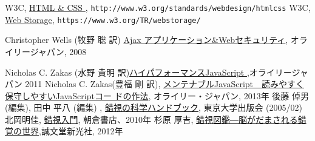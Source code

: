 \begin{thebibliography}{99}
 W3C,
				 \href{http://www.w3.org/standards/webdesign/htmlcss}
				 {HTML \& CSS
         }, \texttt{http://www.w3.org/standards/webdesign/htmlcss}
\ifSeminor
\else
 W3C, \href{https://www.w3.org/TR/webstorage/}
				 {Web Storage}, \texttt{https://www.w3.org/TR/webstorage/}
\fi
\iffalse\else
\ifSeminor
\else
 Christopher Wells (牧野 聡  訳)
\href{http://www.amazon.co.jp/Ajaxアプリケーション-Webセキュリティ-Christopher-Wells/dp/487311358X/ref=sr_1_2?ie=UTF8&s=books&qid=1208068747&sr=8-2}
	 {Ajax アプリケーション\&Webセキュリティ}, オライリージャパン, 2008
    \fi
 \fi
 Nicholas C. Zakas (水野 貴明 訳)\href{http://www.amazon.co.jp/%E3%83%8F%E3%82%A4%E3%83%91%E3%83%95%E3%82%A9%E3%83%BC%E3%83%9E%E3%83%B3%E3%82%B9JavaScript-Nicholas-C-Zakas/dp/487311490X/ref=sr_1_1?ie=UTF8&s=books&qid=1304649839&sr=8-1}{ハイパフォーマンスJavaScript },オライリージャパン 2011
Nicholas C. Zakas(豊福 剛 訳), 
\href{http://www.amazon.co.jp/%E3%83%A1%E3%83%B3%E3%83%86%E3%83%8A%E3%83%96%E3%83%ABJavaScript-%E2%80%95%E8%AA%AD%E3%81%BF%E3%82%84%E3%81%99%E3%81%8F%E4%BF%9D%E5%AE%88%E3%81%97%E3%82%84%E3%81%99%E3%81%84JavaScript%E3%82%B3%E3%83%BC%E3%83%89%E3%81%AE%E3%81%9F%E3%82%81%E3%81%AE%E4%BD%9C%E6%B3%95-Nicholas-C-Zakas/dp/4873116104/ref=sr_1_1?ie=UTF8&qid=1365330242&sr=8-1&keywords=%E3%83%A1%E3%83%B3%E3%83%86%E3%83%8A%E3%83%96%E3%83%ABJavaScript%E3%80%80}
{メンテナブルJavaScript　読みやすく保守しやすいJavaScriptコー
ドの作法}, オライリー・ジャパン, 2013年
後藤 倬男 (編集), 田中 平八 (編集) , \href{http://www.amazon.co.jp/%E9%8C%AF%E8%A6%96%E3%81%AE%E7%A7%91%E5%AD%A6%E3%83%8F%E3%83%B3%E3%83%89%E3%83%96%E3%83%83%E3%82%AF-%E5%BE%8C%E8%97%A4-%E5%80%AC%E7%94%B7/dp/4130111159/sr=1-3/qid=1167376185/ref=sr_1_3/503-0729601-8062303?ie=UTF8&s=books}
{錯視の科学ハンドブック}, 東京大学出版会 (2005/02)
北岡明佳, 
				\href{http://www.amazon.co.jp/%E9%8C%AF%E8%A6%96%E5%85%A5%E9%96%80-%E5%8C%97%E5%B2%A1-%E6%98%8E%E4%BD%B3/dp/4254102267/ref=sr_1_2?s=books&ie=UTF8&qid=1457334952&sr=1-2&keywords=%E5%8C%97%E5%B2%A1%E6%98%8E%E4%BD%B3}
				{錯視入門}, 朝倉書店、2010年
        \iffalse
 杉原 厚吉,
				\href{http://www.amazon.co.jp/%E9%8C%AF%E8%A6%96%E5%9B%B3%E9%91%91%E2%80%95%E8%84%B3%E3%81%8C%E3%81%A0%E3%81%BE%E3%81%95%E3%82%8C%E3%82%8B%E9%8C%AF%E8%A6%9A%E3%81%AE%E4%B8%96%E7%95%8C-%E6%9D%89%E5%8E%9F-%E5%8E%9A%E5%90%89/dp/4416212658/ref=sr_1_4?s=books&ie=UTF8&qid=1457335216&sr=1-4&keywords=%E9%8C%AF%E8%A6%96}{錯視図鑑―脳がだまされる錯覚の世界},誠文堂新光社, 2012年

\end{thebibliography}
